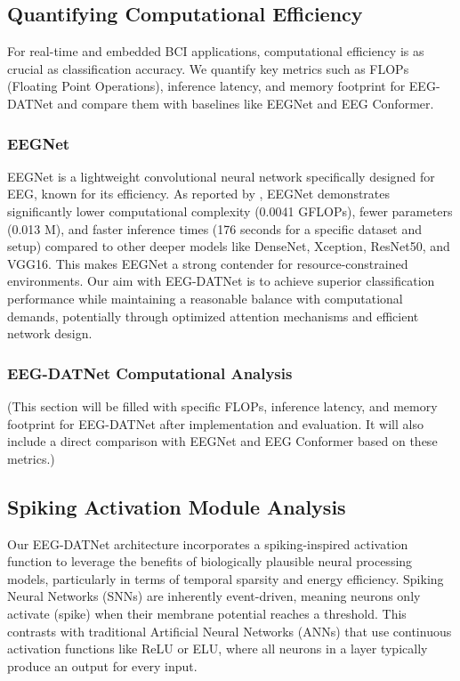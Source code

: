 \documentclass[pdflatex,sn-mathphys-num]{sn-jnl}
\theoremstyle{thmstyleone}%
\theoremstyle{thmstyletwo}%
\theoremstyle{thmstylethree}%
\begin{document}
\subsection{Quantifying Computational Efficiency}

For real-time and embedded BCI applications, computational efficiency is as crucial as classification accuracy. We quantify key metrics such as FLOPs (Floating Point Operations), inference latency, and memory footprint for EEG-DATNet and compare them with baselines like EEGNet and EEG Conformer.

\subsubsection{EEGNet}

EEGNet \cite{lawhern2018eegnet} is a lightweight convolutional neural network specifically designed for EEG, known for its efficiency. As reported by \citet{xu2021transfer}, EEGNet demonstrates significantly lower computational complexity (0.0041 GFLOPs), fewer parameters (0.013 M), and faster inference times (176 seconds for a specific dataset and setup) compared to other deeper models like DenseNet, Xception, ResNet50, and VGG16. This makes EEGNet a strong contender for resource-constrained environments. Our aim with EEG-DATNet is to achieve superior classification performance while maintaining a reasonable balance with computational demands, potentially through optimized attention mechanisms and efficient network design.

\subsubsection{EEG-DATNet Computational Analysis}

(This section will be filled with specific FLOPs, inference latency, and memory footprint for EEG-DATNet after implementation and evaluation. It will also include a direct comparison with EEGNet and EEG Conformer based on these metrics.)

\subsection{Spiking Activation Module Analysis}

Our EEG-DATNet architecture incorporates a spiking-inspired activation function to leverage the benefits of biologically plausible neural processing models, particularly in terms of temporal sparsity and energy efficiency. Spiking Neural Networks (SNNs) are inherently event-driven, meaning neurons only activate (spike) when their membrane potential reaches a threshold. This contrasts with traditional Artificial Neural Networks (ANNs) that use continuous activation functions like ReLU or ELU, where all neurons in a layer typically produce an output for every input.
\end{document}
